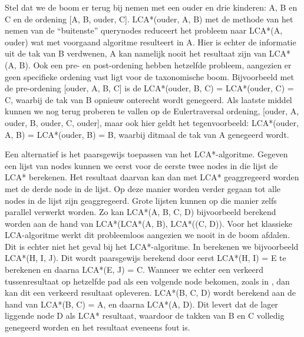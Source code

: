 Stel dat we de boom er terug bij nemen met een ouder en drie kinderen: A, B en C
en de ordening [A, B, ouder, C]. LCA*(ouder, A, B) met de methode van het nemen
van de ``buitenste'' querynodes reduceert het probleem naar LCA*(A, ouder) wat
met voorgaand algoritme resulteert in A. Hier is echter de informatie uit de tak
van B verdwenen, A kan namelijk nooit het resultaat zijn van LCA*(A, B). Ook een
pre- en post-ordening hebben hetzelfde probleem, aangezien er geen specifieke
ordening vast ligt voor de taxonomische boom. Bijvoorbeeld met de pre-ordening
[ouder, A, B, C] is de LCA*(ouder, B, C) = LCA*(ouder, C) = C, waarbij de tak
van B opnieuw onterecht wordt genegeerd. Als laatste middel kunnen we nog terug
proberen te vallen op de Eulertraversal ordening, [ouder, A, ouder, B, ouder, C,
ouder], maar ook hier geldt het tegenvoorbeeld: LCA*(ouder, A, B) = LCA*(ouder,
B) = B, waarbij ditmaal de tak van A genegeerd wordt.

Een alternatief is het paarsgewijs toepassen van het LCA*-algoritme. Gegeven een
lijst van nodes kunnen we eerst voor de eerste twee nodes in die lijst de LCA*
berekenen. Het resultaat daarvan kan dan met LCA* geaggregeerd worden met de
derde node in de lijst. Op deze manier worden verder gegaan tot alle nodes in de
lijst zijn geaggregeerd. Grote lijsten kunnen op die manier zelfs parallel
verwerkt worden. Zo kan LCA*(A, B, C, D) bijvoorbeeld berekend worden aan de
hand van LCA*(LCA*(A, B), LCA*((C, D)). Voor het klassieke LCA-algoritme werkt
dit probleemloos aangezien we nooit in de boom afdalen. Dit is echter niet het
geval bij het LCA*-algoritme. In  berekenen we bijvoorbeeld
LCA*(H, I, J). Dit wordt paarsgewijs berekend door eerst LCA*(H, I) = E te
berekenen en daarna LCA*(E, J) = C. Wanneer we echter een verkeerd
tussenresultaat op hetzelfde pad als een volgende node bekomen, zoals in
, dan kan dit een verkeerd resultaat opleveren. LCA*(B, C, D)
wordt berekend aan de hand van LCA*(B, C) = A, en daarna LCA*(A, D). Dit levert
dat de lager liggende node D als LCA* resultaat, waardoor de takken van B en C
volledig genegeerd worden en het resultaat eveneens fout is.


